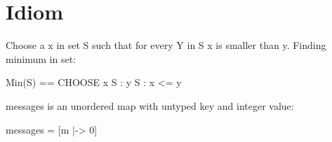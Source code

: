 \chapter{Idiom}

Choose a x in set S such that for every Y in S x is smaller than y.
Finding minimum in set:\newline
\begin{tla}
    Min(S) == CHOOSE x \in S : \A y \in S : x <= y
\end{tla}
\begin{tlatex}
\end{tlatex}
\newline

messages is an unordered map with untyped key and integer value:\newline

\begin{tla}
messages = [m \in {} |-> 0]
\end{tla}
\begin{tlatex}
%
\end{tlatex}

